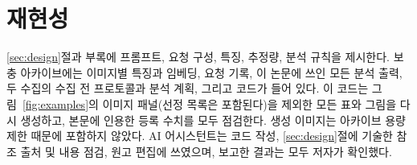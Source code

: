 \documentclass[10pt]{article}
\begin{document}
\section*{재현성}
\ref{sec:design}절과 부록에 프롬프트, 요청 구성, 특징, 추정량, 분석 규칙을 제시한다. 보충 아카이브에는
이미지별 특징과 임베딩, 요청 기록, 이 논문에 쓰인 모든 분석 출력, 두 수집의 수집 전 프로토콜과 분석 계획,
그리고 코드가 들어 있다. 이 코드는 그림~\ref{fig:examples}의 이미지 패널(선정 목록은 포함된다)을
제외한 모든 표와 그림을 다시 생성하고, 본문에 인용한 등록 수치를 모두 점검한다. 생성 이미지는 아카이브
용량 제한 때문에 포함하지 않았다. AI 어시스턴트는 코드 작성, \ref{sec:design}절에 기술한 참조 출처 및
내용 점검, 원고 편집에 쓰였으며, 보고한 결과는 모두 저자가 확인했다.




\clearpage
\appendix

\end{document}
